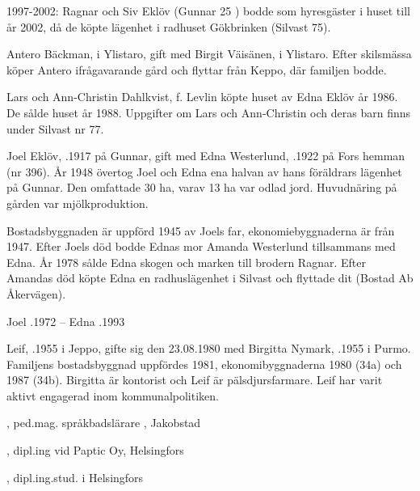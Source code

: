 1997-2002: Ragnar och Siv Eklöv (Gunnar 25 ) bodde som hyresgäster i huset till år 2002, då de köpte lägenhet i radhuset Gökbrinken (Silvast 75).


Antero Bäckman,  i Ylistaro, gift med Birgit Väisänen,  i Ylistaro. Efter skilsmässa köper Antero ifrågavarande gård och flyttar från Keppo, där familjen bodde.
\begin{jhchildren}
  \item {}
  \item {}
\end{jhchildren}


Lars och Ann-Christin Dahlkvist, f. Levlin  köpte huset av Edna Eklöv år 1986. De sålde huset år 1988. Uppgifter om Lars och Ann-Christin och deras barn finns under Silvast nr 77.


Joel Eklöv, .1917 på Gunnar, gift med Edna Westerlund, .1922 på Fors hemman (nr 396). År 1948 övertog Joel och Edna ena halvan av hans föräldrars lägenhet på Gunnar. Den omfattade 30 ha, varav 13 ha var odlad jord. Huvudnäring på gården var mjölkproduktion.

Bostadsbyggnaden är uppförd 1945 av Joels far, ekonomiebyggnaderna är från 1947. Efter Joels död bodde Ednas mor Amanda Westerlund tillsammans med Edna. År 1978 sålde Edna skogen och marken till brodern Ragnar. Efter Amandas död köpte Edna en radhuslägenhet i Silvast och flyttade dit (Bostad Ab Åkervägen).

Joel .1972  --  Edna .1993



Leif, .1955 i Jeppo, gifte sig den 23.08.1980 med Birgitta Nymark, .1955 i Purmo. Familjens bostadsbyggnad uppfördes 1981, ekonomibyggnaderna 1980 (34a) och 1987 (34b). Birgitta är kontorist och Leif är pälsdjursfarmare. Leif har varit aktivt engagerad inom kommunalpolitiken.
\begin{jhchildren}
  \item {}, ped.mag. språkbadslärare , Jakobstad
  \item {}, dipl.ing vid Paptic Oy, Helsingfors
  \item {}, dipl.ing.stud. i Helsingfors
\end{jhchildren}
